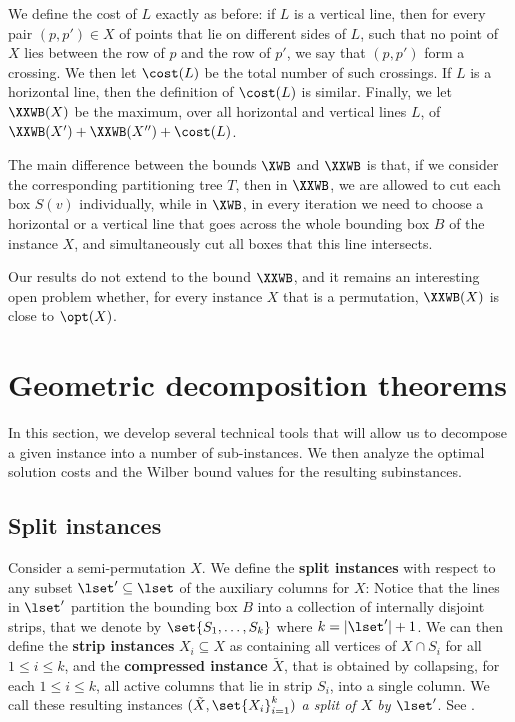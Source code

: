 We define the cost of $L$ exactly as before: if $L$ is a vertical line, then for every pair $(p,p')\in X$ of points that lie on different sides of $L$, such that no point of $X$ lies between the row of $p$ and the row of $p'$, we say that $(p,p')$ form a crossing. We then let $\cost(L)$ be the total number of such crossings. If $L$ is a horizontal line, then the definition of $\cost(L)$ is similar. Finally, we let $\XXWB(X)$ be the maximum, over all horizontal and vertical lines $L$, of $\XXWB(X')+\XXWB(X'')+\cost(L)$.

The main difference between the bounds $\XWB$ and $\XXWB$ is that, if we consider the corresponding partitioning tree $T$, then in $\XXWB$, we are allowed to cut each box $S(v)$ individually, while in $\XWB$, in every iteration we need to choose a horizontal or a vertical line that goes across the whole bounding box $B$ of the instance $X$, and simultaneously cut all boxes that this line intersects.

Our results do not extend to the bound $\XXWB$, and it remains an interesting open problem whether, for every instance $X$ that is a permutation, $\XXWB(X)$ is close to $\opt(X)$.
\fi 





%


%


\section{Geometric decomposition theorems} 
\label{sec: decomp}

In this section, we develop several technical tools that will allow us to decompose a given instance into a number of sub-instances. We then analyze the optimal solution costs and the Wilber bound values for the resulting subinstances.
%
%
%


\subsection{Split instances}
\label{sec:split instance} 

Consider a semi-permutation $X$. 
We  define the \textbf{split instances} with respect to any subset $\lset' \subseteq \lset$ of the auxiliary columns for $X$:
Notice that the lines in $\lset'$ partition the bounding box $B$ into a collection of internally disjoint strips, that we denote by $\set{S_1,\ldots,S_k}$ where $k = |\lset'|+1$.
We can then define the \textbf{strip instances} $X_i \subseteq X$ as containing all vertices of $X\cap S_i$ for all $1\leq i\leq k$, and the \textbf{compressed instance} $\tilde X$, that is obtained by collapsing, for each $1\leq i\leq k$, all active columns that lie in strip $S_i$, into a single column.
We  call these resulting instances $(\tilde{X}, \set{X_i}_{i=1}^{k})$  \emph{a split of $X$ by $\lset'$}. 
See . 

